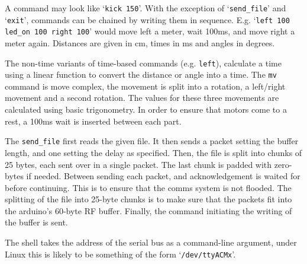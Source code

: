 \documentclass[a4paper]{scrartcl}
\begin{document}
A command may look like `\verb$kick 150$'. With the exception of
`\verb$send_file$' and `\verb$exit$', commands can be chained by writing them
in sequence. E.g.  `\texttt{left 100 led\_on 100 right 100}' would move left a
meter, wait 100ms, and move right a meter again. Distances are given in cm,
times in ms and angles in degrees.

The non-time variants of time-based commands (e.g. \verb$left$), calculate a
time using a linear function to convert the distance or angle into a time. The
\verb$mv$ command is move complex, the movement is split into a rotation, a
left/right movement and a second rotation. The values for these three movements
are calculated using basic trigonometry. In order to ensure that motors come to
a rest, a 100ms wait is inserted between each part.

The \verb$send_file$ first reads the given file. It then sends a packet setting
the buffer length, and one setting the delay as specified. Then, the file is
split into chunks of 25 bytes, each sent over in a single packet. The last
chunk is padded with zero-bytes if needed. Between sending each packet, and
acknowledgement is waited for before continuing. This is to ensure that the
comms system is not flooded. The splitting of the file into 25-byte chunks is
to make sure that the packets fit into the arduino's 60-byte RF buffer.
Finally, the command initiating the writing of the buffer is sent.

The shell takes the address of the serial bus as a command-line argument, under
Linux this is likely to be something of the form `\verb$/dev/ttyACMx$'.


\end{document}
